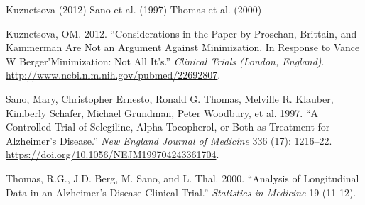 \documentclass[
  11pt,
]{article}
\newlength{\cslhangindent}
\newlength{\cslentryspacingunit} %
\newenvironment{CSLReferences}[2] %
 {%
  \setlength{\parindent}{0pt}
  \ifodd #1
  \let\oldpar\par
  \def\par{\hangindent=\cslhangindent\oldpar}
  \fi
  \setlength{\parskip}{#2\cslentryspacingunit}
 }%
 {}
\begin{document}
Kuznetsova (2012) Sano et al. (1997) Thomas et al. (2000)

\hypertarget{refs}{}
\begin{CSLReferences}{1}{0}
\leavevmode{}%
Kuznetsova, OM. 2012. {``Considerations in the Paper by Proschan,
Brittain, and Kammerman Are Not an Argument Against Minimization. In
Response to Vance W Berger'Minimization: Not All It's.''} \emph{Clinical
Trials (London, England)}.
\url{http://www.ncbi.nlm.nih.gov/pubmed/22692807}.

\leavevmode{}%
Sano, Mary, Christopher Ernesto, Ronald G. Thomas, Melville R. Klauber,
Kimberly Schafer, Michael Grundman, Peter Woodbury, et al. 1997. {``A
Controlled Trial of Selegiline, Alpha-Tocopherol, or Both as Treatment
for Alzheimer's Disease.''} \emph{New England Journal of Medicine} 336
(17): 1216--22. \url{https://doi.org/10.1056/NEJM199704243361704}.

\leavevmode{}%
Thomas, R.G., J.D. Berg, M. Sano, and L. Thal. 2000. {``Analysis of
Longitudinal Data in an Alzheimer's Disease Clinical Trial.''}
\emph{Statistics in Medicine} 19 (11-12).

\end{CSLReferences}
\end{document}
